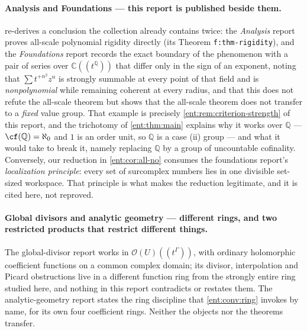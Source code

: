 \documentclass[11pt]{article}
\theoremstyle{plain}
\theoremstyle{plain}
\theoremstyle{plain}
\theoremstyle{definition}
\theoremstyle{definition}
\theoremstyle{definition}
\theoremstyle{definition}
\theoremstyle{remark}
\newcommand{\C}{\mathbb C}\newcommand{\R}{\mathbb R}
\newcommand{\Q}{\mathbb Q}\newcommand{\Z}{\mathbb Z}\newcommand{\N}{\mathbb N}
\begin{document}
\paragraph{Analysis and Foundations --- this report is published beside them.}
 re-derives a conclusion the collection already contains
twice: the \emph{Analysis} report proves all-scale polynomial rigidity
directly (its Theorem \texttt{f:thm-rigidity}), and the \emph{Foundations}
report records the exact boundary of the phenomenon with a pair of series
over $\C((t^\Q))$ that differ only in the sign of an exponent, noting that
$\sum t^{+n^2}z^n$ is strongly summable at every point of that field and is
\emph{nonpolynomial} while remaining coherent at every radius, and that this
does not refute the all-scale theorem but shows that the all-scale theorem
does not transfer to a \emph{fixed} value group. That example is precisely
\cref{ent:rem:criterion-strength} of this report, and the trichotomy of
\cref{ent:thm:main} explains why it works over $\Q$ --- $\cf(\Q)=\aleph_0$
and $1$ is an order unit, so $\Q$ is a case (ii) group --- and what it would
take to break it, namely replacing $\Q$ by a group of uncountable cofinality.
Conversely, our reduction in \cref{ent:cor:all-no} consumes the foundations
report's \emph{localization principle}: every set of surcomplex numbers lies
in one divisible set-sized workspace. That principle is what makes the
reduction legitimate, and it is cited here, not reproved.

\paragraph{Global divisors and analytic geometry --- different rings, and
two restricted products that restrict different things.}
The global-divisor report \cite{RepoDivisors} works in
$\mathcal O(U)((t^\Gamma))$, with ordinary holomorphic coefficient functions
on a common complex domain; its divisor, interpolation and Picard
obstructions live in a different function ring from the strongly entire ring
studied here, and nothing in this report contradicts or restates them. The
analytic-geometry report states the ring discipline that
\cref{ent:conv:ring} invokes by name, for its own four coefficient rings.
Neither the objects nor the theorems transfer.
\end{document}
